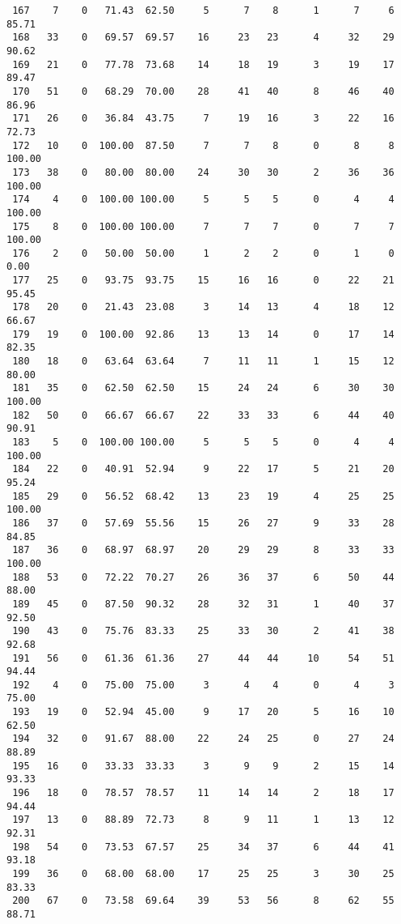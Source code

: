 \begin{verbatim}
 167    7    0   71.43  62.50     5      7    8      1      7     6    85.71
 168   33    0   69.57  69.57    16     23   23      4     32    29    90.62
 169   21    0   77.78  73.68    14     18   19      3     19    17    89.47
 170   51    0   68.29  70.00    28     41   40      8     46    40    86.96
 171   26    0   36.84  43.75     7     19   16      3     22    16    72.73
 172   10    0  100.00  87.50     7      7    8      0      8     8   100.00
 173   38    0   80.00  80.00    24     30   30      2     36    36   100.00
 174    4    0  100.00 100.00     5      5    5      0      4     4   100.00
 175    8    0  100.00 100.00     7      7    7      0      7     7   100.00
 176    2    0   50.00  50.00     1      2    2      0      1     0     0.00
 177   25    0   93.75  93.75    15     16   16      0     22    21    95.45
 178   20    0   21.43  23.08     3     14   13      4     18    12    66.67
 179   19    0  100.00  92.86    13     13   14      0     17    14    82.35
 180   18    0   63.64  63.64     7     11   11      1     15    12    80.00
 181   35    0   62.50  62.50    15     24   24      6     30    30   100.00
 182   50    0   66.67  66.67    22     33   33      6     44    40    90.91
 183    5    0  100.00 100.00     5      5    5      0      4     4   100.00
 184   22    0   40.91  52.94     9     22   17      5     21    20    95.24
 185   29    0   56.52  68.42    13     23   19      4     25    25   100.00
 186   37    0   57.69  55.56    15     26   27      9     33    28    84.85
 187   36    0   68.97  68.97    20     29   29      8     33    33   100.00
 188   53    0   72.22  70.27    26     36   37      6     50    44    88.00
 189   45    0   87.50  90.32    28     32   31      1     40    37    92.50
 190   43    0   75.76  83.33    25     33   30      2     41    38    92.68
 191   56    0   61.36  61.36    27     44   44     10     54    51    94.44
 192    4    0   75.00  75.00     3      4    4      0      4     3    75.00
 193   19    0   52.94  45.00     9     17   20      5     16    10    62.50
 194   32    0   91.67  88.00    22     24   25      0     27    24    88.89
 195   16    0   33.33  33.33     3      9    9      2     15    14    93.33
 196   18    0   78.57  78.57    11     14   14      2     18    17    94.44
 197   13    0   88.89  72.73     8      9   11      1     13    12    92.31
 198   54    0   73.53  67.57    25     34   37      6     44    41    93.18
 199   36    0   68.00  68.00    17     25   25      3     30    25    83.33
 200   67    0   73.58  69.64    39     53   56      8     62    55    88.71

\end{verbatim}
